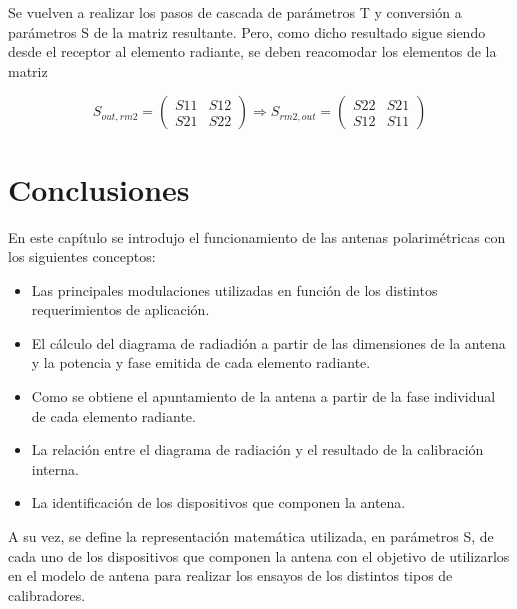 Se vuelven a realizar los pasos de cascada de parámetros T y conversión a parámetros S de la matriz resultante. Pero, como
dicho resultado sigue siendo desde el receptor al elemento radiante, se deben reacomodar los elementos de la matriz

$$
	S_{out,rm2} = \begin{pmatrix} S11&S12 \\ S21&S22\end{pmatrix} \Rightarrow
	S_{rm2, out} = \begin{pmatrix} S22&S21 \\ S12&S11 \end{pmatrix}
$$

\section{Conclusiones}

En este capítulo se introdujo el funcionamiento de las antenas polarimétricas con los siguientes conceptos:
\begin{itemize}
	\item Las principales modulaciones utilizadas en función de los distintos requerimientos de aplicación.
	\item El cálculo del diagrama de radiadión a partir de las dimensiones de la antena y la potencia y fase emitida de cada 
		elemento radiante.
	\item Como se obtiene el apuntamiento de la antena a partir de la fase individual de cada elemento radiante. 
	\item La relación entre el diagrama de radiación y el resultado de la calibración interna. 
	\item La identificación de los dispositivos que componen la antena.
\end{itemize}

A su vez, se define la representación matemática utilizada, en parámetros S, de cada uno de los dispositivos que componen la 
antena con el objetivo de utilizarlos en el modelo de antena para realizar los ensayos de los distintos tipos de calibradores.


